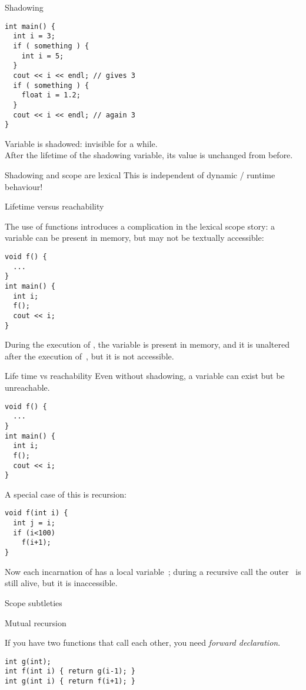 \begin{slide}{Shadowing}
  \label{sl:scope-shadow}
\begin{verbatim}
int main() {
  int i = 3;
  if ( something ) {
    int i = 5;
  }
  cout << i << endl; // gives 3
  if ( something ) {
    float i = 1.2;
  }
  cout << i << endl; // again 3
}
\end{verbatim}
Variable  is shadowed: invisible for a while.\\
After the lifetime of the shadowing variable, its value is unchanged
from before.
\end{slide}

\begin{block}{Shadowing and scope are lexical}
  \label{sl:scope-shadowfalse}
  This is independent of dynamic / runtime behaviour!
\end{block}

 {Lifetime versus reachability}

The use of functions introduces a complication in the lexical scope story:
a variable can be present in memory, but may not be textually accessible:
\begin{verbatim}
void f() {
  ...
}
int main() {
  int i;
  f();
  cout << i;
}
\end{verbatim}
During the execution of , the variable  is present in
memory, and it is unaltered after the execution of~,
but it is not accessible.

\begin{slide}{Life time vs reachability}
  \label{sl:scope-lifetime}
  Even without shadowing, a variable can exist but be unreachable.
\begin{verbatim}
void f() {
  ...
}
int main() {
  int i;
  f();
  cout << i;
}
\end{verbatim}
\end{slide}

A special case of this is recursion:
\begin{verbatim}
void f(int i) {
  int j = i;
  if (i<100)
    f(i+1);
}
\end{verbatim}
Now each incarnation of  has a local variable~; during a
recursive call the outer~ is still alive, but it is inaccessible.

 {Scope subtleties}

 {Mutual recursion}

If you have two functions  that call each other, you need
%
\emph{forward declaration}.
%
\begin{verbatim}
int g(int);
int f(int i) { return g(i-1); }
int g(int i) { return f(i+1); }
\end{verbatim}

